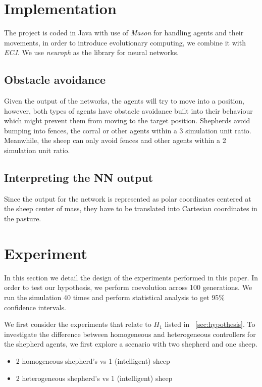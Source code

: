 \documentclass[conference]{IEEEtran}
\begin{document}
\section{Implementation}
The project is coded in Java with use of \textit{Mason} for handling agents and their movements, in order to introduce evolutionary computing, we combine it with \textit{ECJ}. 
We use \textit{neuroph} as the library for neural networks. 

\subsection{Obstacle avoidance}
Given the output of the networks, the agents will try to move into a position, however, both types of agents have obstacle avoidance built into their behaviour which might prevent them from moving to the target position. Shepherds avoid bumping into fences, the corral or other agents within a 3 simulation unit ratio. Meanwhile, the sheep can only avoid fences and other agents within a 2 simulation unit ratio. 

\subsection{Interpreting the NN output}
Since the output for the network is represented as polar coordinates centered at the sheep center of mass, they have to be translated into Cartesian coordinates in the pasture. 


\section{Experiment}
\label{sec:experiment}
In this section we detail the design of the experiments performed in this paper. In order to test our hypothesis, we perform coevolution across 100 generations. We run the simulation 40 times and perform statistical analysis to get 95\% confidence intervals.


We first consider the experiments that relate to $H_1$ listed in ~\ref{sec:hypothesis}. To investigate the difference between homogeneous and heterogeneous controllers for the shepherd agents, we first explore a scenario with two shepherd and one sheep. 
\begin{itemize}
	\item 2 homogeneous shepherd’s vs 1 (intelligent) sheep
	\item 2 heterogeneous shepherd’s vs 1 (intelligent) sheep
\end{itemize}
 
\end{document}
